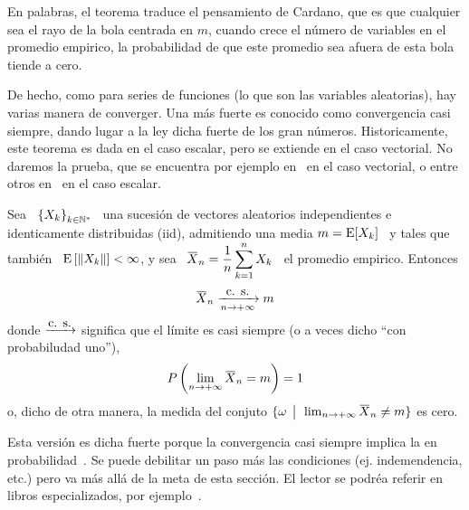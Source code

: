 En palabras, el teorema traduce el  pensamiento de Cardano, que es que cualquier
sea el rayo de la bola centrada en $m$, cuando crece el n\'umero de variables en
el promedio  empirico, la probabilidad de  que este promedio sea  afuera de esta
bola tiende a cero.

De hecho, como  para series de funciones (lo que  son las variables aleatorias),
hay varias manera  de converger. Una m\'as fuerte  es conocido como convergencia
casi  siempre,  dando  lugar a  la  ley  dicha  fuerte  de los  gran  n\'umeros.
Historicamente, este teorema es dada en  el caso escalar, pero se extiende en el
caso  vectorial.    No  daremos  la   prueba,  que  se  encuentra   por  ejemplo
en~\cite[Teo.~6.4.2]{Gre63}    en   el   caso    vectorial,   o    entre   otros
en~\cite[Teo.~22.1]{Bil12} en el caso escalar.
%
\begin{teorema}
%
  Sea  \ $\left\{ X_k  \right\}_{k \in  \mathbb{N}^*}$ \  una sucesi\'on  de vectores
  aleatorios independientes  e identicamente distribuidas  (iid), admitiendo una
  media  $m =  \operatorname{E}[X_k]$ \  y  tales que  tambi\'en \  $\operatorname{E}\left[ \left\|  X_k
    \right\| \right] <  \infty$, y sea \ $\displaystyle  \widebar{X}_n = \frac1n
  \sum_{k=1}^n X_k$ \ el promedio empirico. Entonces
  \[
  \widebar{X}_n \limitcs{n \to +\infty} m
  \]
  donde $\xrightarrow[]{\mbox{c. s.}}$ significa que el l\'imite  es casi siempre (o a veces dicho
  ``con probabiludad uno''), \ie
  \[
  P\left(    \lim_{n \to +\infty}   \widebar{X}_n =  m \right) = 1
  \]
  o, dicho  de otra  manera, la medida  del conjuto  $\{ \omega \tq  \lim_{n \to
    +\infty} \widebar{X}_n \ne m \}$ es cero.
\end{teorema}
%

Esta versi\'on es dicha fuerte porque la convergencia casi siempre implica la en
probabilidad~\cite{Fel71, Shi84, AshDol99, JacPro03, AthLah06, Bil12, Coh13}. Se
puede debilitar un paso m\'as  las condiciones (ej. indemendencia, etc.) pero va
m\'as all\'a  de la  meta de esta  secci\'on. El  lector se podr\'ea  referir en
libros  especializados,  por  ejemplo~\cite{Fel71,  Shi84,  AshDol99,  JacPro03,
  AthLah06, Bil12, Coh13}.


